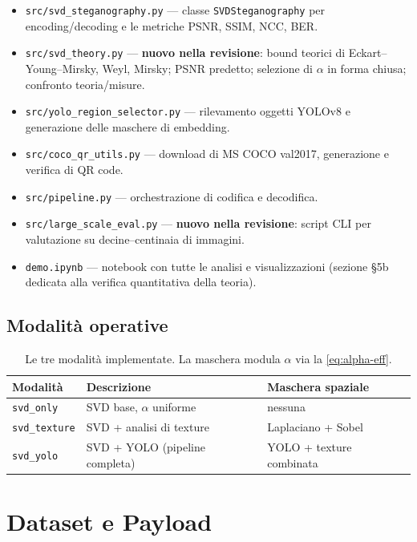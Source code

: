 \documentclass[11pt,a4paper]{article}
\theoremstyle{definition}
\theoremstyle{remark}
\begin{document}
\begin{itemize}[leftmargin=*,itemsep=2pt]
  \item \verb|src/svd_steganography.py| --- classe \verb|SVDSteganography| per
    encoding/decoding e le metriche PSNR, SSIM, NCC, BER.
  \item \verb|src/svd_theory.py| --- \textbf{nuovo nella revisione}: bound
    teorici di Eckart--Young--Mirsky, Weyl, Mirsky; PSNR predetto;
    selezione di $\alpha$ in forma chiusa; confronto teoria/misure.
  \item \verb|src/yolo_region_selector.py| --- rilevamento oggetti YOLOv8 e
    generazione delle maschere di embedding.
  \item \verb|src/coco_qr_utils.py| --- download di MS COCO val2017,
    generazione e verifica di QR code.
  \item \verb|src/pipeline.py| --- orchestrazione di codifica e decodifica.
  \item \verb|src/large_scale_eval.py| --- \textbf{nuovo nella revisione}:
    script CLI per valutazione su decine--centinaia di immagini.
  \item \verb|demo.ipynb| --- notebook con tutte le analisi e visualizzazioni
    (sezione \S5b dedicata alla verifica quantitativa della teoria).
\end{itemize}

\subsection{Modalità operative}

\begin{table}[H]\centering
\begin{tabular}{lll}
\toprule
\textbf{Modalità} & \textbf{Descrizione} & \textbf{Maschera spaziale} \\
\midrule
\verb|svd_only|    & SVD base, $\alpha$ uniforme              & nessuna \\
\verb|svd_texture| & SVD + analisi di texture                 & Laplaciano + Sobel \\
\verb|svd_yolo|    & SVD + YOLO (pipeline completa)           & YOLO + texture combinata \\
\bottomrule
\end{tabular}
\caption{Le tre modalità implementate. La maschera modula $\alpha$ via la
\eqref{eq:alpha-eff}.}
\end{table}


\section{Dataset e Payload}
\end{document}
